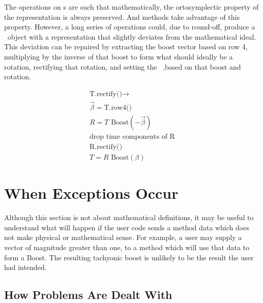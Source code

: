 The operations on \LT s are such that mathematically, the ortosymplectic
property of 
the representation is always preserved.  And methods take advantage of this 
property. 
However, a long series of operations could, due to round-off, produce a 
\LT\ object with a representation that slightly deviates from the  mathematical
ideal.  This deviation can be repaired by extracting the boost vector based on
row 4, multiplying by the inverse of that boost to form what should ideally be 
a rotation, rectifying that rotation, and setting the \LT\ ,based on that boost
and rotation.

\begin{eqnarray}
\label{eq:rectLT}
\mbox{T.rectify()} \rightarrow \nonumber \\
  \vec{\beta} = \mbox {T.row4()} \nonumber \\
  R = T \mbox{ Boost}(-\vec{\beta})   \nonumber \\
  \mbox {drop time components of R} \nonumber \\
  \mbox {R.rectify()} 		    \nonumber \\
  T = R \mbox{ Boost}(\beta)
\end{eqnarray}

\newpage
\section{When Exceptions Occur}


Although this section is not about mathematical definitions, it may be useful
to understand what will happen if the user code sends a method  
data which does not make physical or mathematical sense.  For example, 
a user may supply a vector of magnitude greater than one, to a method
which will use that data to form a Boost.  The resulting tachyonic boost
is unlikely to be the result the user had intended.

\subsection{How Problems Are Dealt With}

